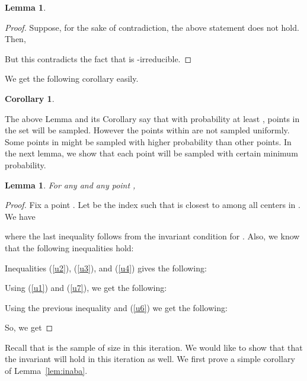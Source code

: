 \documentclass[a4paper]{article}
\newtheorem{lemma}[theorem]{Lemma}
\newtheorem{corollary}[theorem]{Corollary}
\begin{document}
\begin{lemma}
\label{lem:sampled-repeat}
 
\end{lemma}
\begin{proof}
Suppose, for the sake of contradiction, the above statement does not hold. Then,


But this contradicts the fact that  is -irreducible.
\end{proof}

\noindent
We get the following corollary easily.
\begin{corollary}
\label{cor:sample-repeat}

\end{corollary}

The above Lemma and its Corollary say that with probability at least ,
points in the set  will be sampled. However the points within  are not sampled uniformly.
Some points in  might be sampled with higher probability than other points.
In the next lemma, we show that each point will be sampled with certain minimum probability.

\begin{lemma}
\label{lem:key-repeat}
For any  and any point , 
\end{lemma}
\begin{proof}
Fix a point .
Let  be the
 index such that  is closest to  among all centers in .
We have

where the last inequality follows from the invariant condition for .
Also, we know that the following inequalities hold:






Inequalities (\ref{u2}), (\ref{u3}), and (\ref{u4}) gives the following:

Using (\ref{u1}) and (\ref{u7}), we get the following:

Using the previous inequality and (\ref{u6}) we get the following:

So, we get

\end{proof}

Recall that  is the sample of size  in this iteration. We would like to show that  that the invariant
will hold in this iteration as well. We first prove a simple corollary of Lemma~\ref{lem:inaba}.
\end{document}
